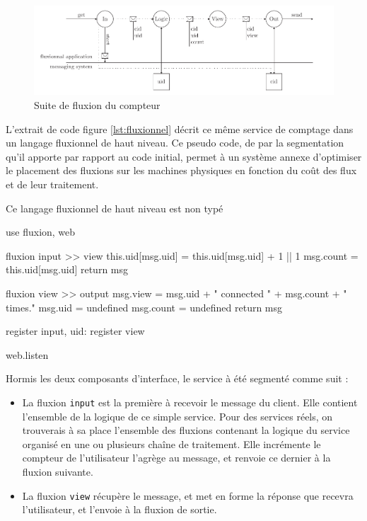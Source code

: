 \begin{figure}[h!]
  \includegraphics[width=\linewidth]{flux.pdf}
  \caption{Suite de fluxion du compteur}
  \label{fig:fluxions}
\end{figure}

L'extrait de code figure \ref{lst:fluxionnel} décrit ce même service de comptage dans un langage fluxionnel de haut niveau.
Ce pseudo code, de par la segmentation qu'il apporte par rapport au code initial, permet à un système annexe d'optimiser le placement des fluxions sur les machines physiques en fonction du coût des flux et de leur traitement.

Ce langage fluxionnel de haut niveau est non typé

\begin{code}[Javascript, caption={Code fluxionnel},label={lst:fluxionnel}]
use fluxion, web

fluxion input >> view
  this.uid[msg.uid] = this.uid[msg.uid] + 1 || 1
  msg.count = this.uid[msg.uid]
  return msg

fluxion view >> output
  msg.view = msg.uid + " connected " + msg.count + " times."
  msg.uid = undefined
  msg.count = undefined
  return msg

register input, {uid: {}}
register view

web.listen
\end{code}

Hormis les deux composants d'interface, le service à été segmenté comme suit :
\begin{itemize}
  \item La fluxion \texttt{input} est la première à recevoir le message du client.
  Elle contient l'ensemble de la logique de ce simple service.
  Pour des services réels, on trouverais à sa place l'ensemble des fluxions contenant la logique du service organisé en une ou plusieurs chaîne de traitement.
  Elle incrémente le compteur de l'utilisateur l'agrège au message, et renvoie ce dernier à la fluxion suivante.
  \item La fluxion \texttt{view} récupère le message, et met en forme la réponse que recevra l'utilisateur, et l'envoie à la fluxion de sortie.
\end{itemize}

